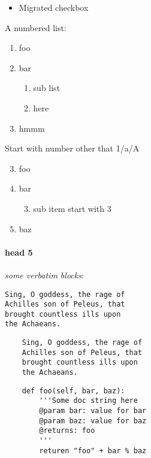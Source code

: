 \begin{itemize}
\item[\RIGHTarrow] Migrated checkbox
\end{itemize}


A numbered list:

\begin{enumerate}[1]
\item foo
\item bar
	\begin{enumerate}[a]
	\item sub list
	\item here
	\end{enumerate}
\item hmmm
\end{enumerate}




Start with number other that 1/a/A



\begin{enumerate}[A]
\setcounter{enumi}{2}
\item foo
\item bar
	\begin{enumerate}[1]
	\setcounter{enumi}{2}
	\item sub item start with 3
	\end{enumerate}
\item baz
\end{enumerate}


\paragraph{head 5}

\emph{some verbatim blocks}:




\begin{lstlisting}
Sing, O goddess, the rage of
Achilles son of Peleus, that
brought countless ills upon
the Achaeans.

\end{lstlisting}



\begin{lstlisting}
    Sing, O goddess, the rage of
    Achilles son of Peleus, that
    brought countless ills upon
    the Achaeans.

\end{lstlisting}



\begin{lstlisting}
    def foo(self, bar, baz):
    	'''Some doc string here
    	@param bar: value for bar
    	@param baz: value for baz
    	@returns: foo
    	'''
    	returen "foo" + bar % baz

\end{lstlisting}


